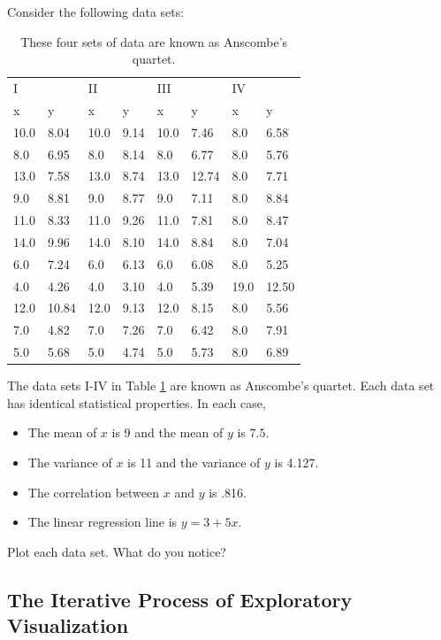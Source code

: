 \begin{problem} %
\label{prob:anscombe}
Consider the following data sets:
\begin{table}[H]
\begin{tabular}{l l  |  l l  |  l l  |  l l }
I & & II & & III & & IV\\
x & y & x & y & x & y & x & y \\
\hline
10.0 & 8.04 & 10.0 & 9.14 & 10.0 & 7.46 & 8.0 & 6.58 \\
8.0 & 6.95 & 8.0 & 8.14 & 8.0 & 6.77 & 8.0 & 5.76 \\
13.0 & 7.58 & 13.0 & 8.74 & 13.0 & 12.74 & 8.0 & 7.71 \\
9.0 & 8.81 & 9.0 & 8.77 & 9.0 & 7.11 & 8.0 & 8.84 \\
11.0 & 8.33 & 11.0 & 9.26 & 11.0 & 7.81 & 8.0 & 8.47 \\
14.0 & 9.96 & 14.0 & 8.10 & 14.0 & 8.84 & 8.0 & 7.04 \\
6.0 & 7.24 & 6.0 & 6.13 & 6.0 & 6.08 & 8.0 & 5.25 \\
4.0 & 4.26 & 4.0 & 3.10 & 4.0 & 5.39 & 19.0 & 12.50 \\
12.0 & 10.84 & 12.0 & 9.13 & 12.0 & 8.15 & 8.0 & 5.56 \\
7.0 & 4.82 & 7.0 & 7.26 & 7.0 & 6.42 & 8.0 & 7.91 \\
5.0 & 5.68 & 5.0 & 4.74 & 5.0 & 5.73 & 8.0 & 6.89 \\
\end{tabular}
\caption{These four sets of data are known as Anscombe's quartet.}
\label{table:anscombe}
\end{table}

The data sets I-IV in Table \ref{table:anscombe} are known as Anscombe's quartet. 
Each data set has identical statistical properties. 
In each case,
\begin{itemize}
\item The mean of $x$ is 9 and the mean of $y$ is $7.5$.
\item The variance of $x$ is 11 and the variance of $y$ is 4.127.
\item The correlation between $x$ and $y$ is .816.
\item The linear regression line is $y=3+5x$.
\end{itemize}
Plot each data set.
What do you notice? %
\end{problem}

\subsection*{The Iterative Process of Exploratory Visualization} %


